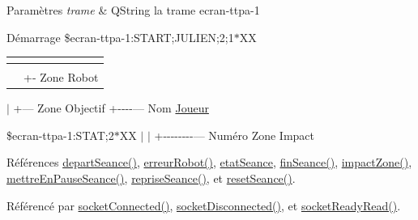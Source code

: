 \begin{DoxyParams}{Paramètres}
{\em trame} & Q\+String la trame ecran-\/ttpa-\/1 \\
\hline
\end{DoxyParams}
Démarrage \$ecran-\/ttpa-\/1\+:S\+T\+A\+RT;J\+U\+L\+I\+EN;2;1$\ast$\+XX \tabulinesep=1mm
\begin{longtabu} spread 0pt [c]{*{2}{|X[-1]}|}
\hline
\rowcolor{\tableheadbgcolor}\textbf{ }&\textbf{ }\\
\endfirsthead
\hline
\endfoot
\hline
\rowcolor{\tableheadbgcolor}\textbf{ }&\textbf{ }\\
\endhead
&+-\/ Zone Robot \\
\end{longtabu}
$\vert$ +--- Zone Objectif +-\/-\/-\/-\/--- Nom \hyperlink{class_joueur}{Joueur}

\$ecran-\/ttpa-\/1\+:S\+T\+AT;2$\ast$\+XX $\vert$ $\vert$ +-\/-\/-\/-\/-\/-\/-\/-\/--- Numéro Zone Impact

Références \hyperlink{class_communication_bluetooth_ab11003b21b249385e466ac80b3a0b780}{depart\+Seance()}, \hyperlink{class_communication_bluetooth_a74bc2dc753fa3490a2847f3c9497e147}{erreur\+Robot()}, \hyperlink{class_communication_bluetooth_adc66f3034d46f3964a26b62ad98e784f}{etat\+Seance}, \hyperlink{class_communication_bluetooth_ac8984ecbcf5b35ae72f3d0668a0cbbcb}{fin\+Seance()}, \hyperlink{class_communication_bluetooth_a71bd8acb7452d3e27884ce696f7a73d9}{impact\+Zone()}, \hyperlink{class_communication_bluetooth_a8572b6316814e3d226ce7acc754f0c4d}{mettre\+En\+Pause\+Seance()}, \hyperlink{class_communication_bluetooth_a332792330a61464c655c99e6379238c1}{reprise\+Seance()}, et \hyperlink{class_communication_bluetooth_a1121bca5300f5bb1df09eb0378feeb0b}{reset\+Seance()}.



Référencé par \hyperlink{class_communication_bluetooth_ab4b02673b1d6ffd5970f9546360b25e7}{socket\+Connected()}, \hyperlink{class_communication_bluetooth_a87e96f5362c1334adb3c930566ca9b88}{socket\+Disconnected()}, et \hyperlink{class_communication_bluetooth_a28b131a307d4a799f4f8d7b6969fa9ca}{socket\+Ready\+Read()}.


